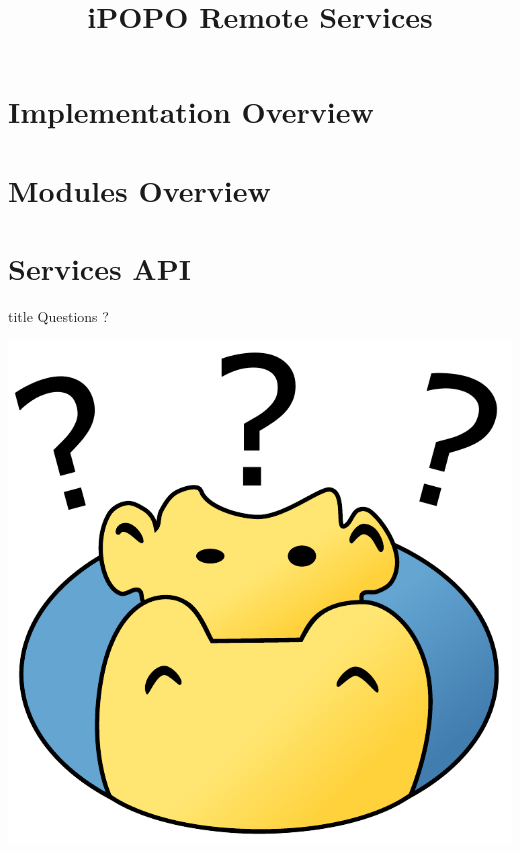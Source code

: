 \documentclass{beamer}
\title[Remote Services]{iPOPO Remote Services}
\begin{document}
\frame{\titlepage}

\section{Implementation Overview}


\section{Modules Overview}


\section{Services API}


\begin{frame}
  \vfill
  \centering
  \begin{beamercolorbox}[sep=8pt,center,shadow=true,rounded=true]{title}
    Questions ?\par%
  \end{beamercolorbox}
  \vspace{3ex}
  \includegraphics[width=.5\textwidth]{../imgs/ipopo_question}
  \vfill
\end{frame}
\end{document}
